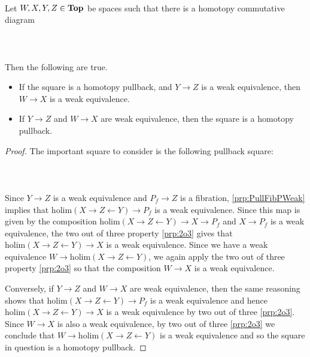 \documentclass[a4paper]{article}
\begin{document}
\begin{prp}{}{}\\
Let $W,X,Y,Z\in\bold{Top}$ be spaces such that there is a homotopy commutative diagram  
 \\~\\  \\~\\
Then the following are true. 
\begin{itemize}
\item If the square is a homotopy pullback, and $Y\to Z$ is a weak equivalence, then $W\to X$ is a weak equivalence. 
\item If $Y\to Z$ and $W\to X$ are weak equivalence, then the square is a homotopy pullback. 
\end{itemize} 
\begin{proof}
The important square to consider is the following pullback square:  
 \\~\\  \\~\\
Since $Y\to Z$ is a weak equivalence and $P_f\to Z$ is a fibration, \ref{prp:PullFibPWeak} implies that $\text{holim}(X\rightarrow Z\leftarrow Y)\to P_f$ is a weak equivalence. Since this map is given by the composition $\text{holim}(X\rightarrow Z\leftarrow Y)\to X\to P_f$ and $X\to P_f$ is a weak equivalence, the two out of three property \ref{prp:2o3} gives that $\text{holim}(X\rightarrow Z\leftarrow Y)\to X$ is a weak equivalence. Since we have a weak equivalence $W\to\text{holim}(X\rightarrow Z\leftarrow Y)$, we again apply the two out of three property \ref{prp:2o3} so that the composition $W\to X$ is a weak equivalence.  

Conversely, if $Y\to Z$ and $W\to X$ are weak equivalence, then the same reasoning shows that $\text{holim}(X\rightarrow Z\leftarrow Y)\to P_f$ is a weak equivalence and hence $\text{holim}(X\rightarrow Z\leftarrow Y)\to X$ is a weak equivalence by two out of three \ref{prp:2o3}. Since $W\to X$ is also a weak equivalence, by two out of three \ref{prp:2o3} we conclude that $W\to\text{holim}(X\rightarrow Z\leftarrow Y)$ is a weak equivalence and so the square in question is a homotopy pullback.
\end{proof}
\end{prp}
\end{document}
